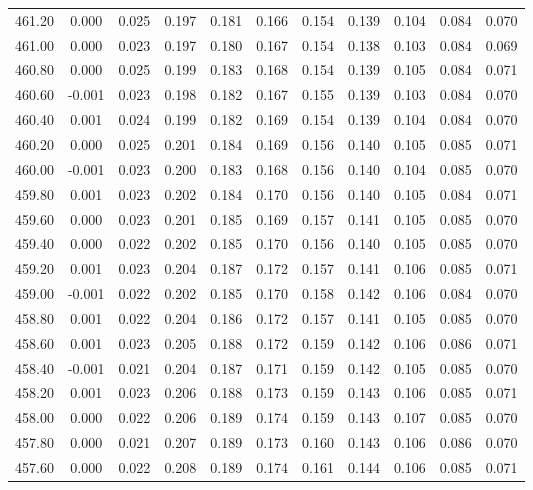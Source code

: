 \begin{longtable}{cccccccccc}
    461.20 &  0.000 &  0.025 &  0.197 &  0.181 &  0.166 &  0.154 &  0.139 &  0.104 &  0.084 &  0.070 \\
    461.00 &  0.000 &  0.023 &  0.197 &  0.180 &  0.167 &  0.154 &  0.138 &  0.103 &  0.084 &  0.069 \\
    460.80 &  0.000 &  0.025 &  0.199 &  0.183 &  0.168 &  0.154 &  0.139 &  0.105 &  0.084 &  0.071 \\
    460.60 & -0.001 &  0.023 &  0.198 &  0.182 &  0.167 &  0.155 &  0.139 &  0.103 &  0.084 &  0.070 \\
    460.40 &  0.001 &  0.024 &  0.199 &  0.182 &  0.169 &  0.154 &  0.139 &  0.104 &  0.084 &  0.070 \\
    460.20 &  0.000 &  0.025 &  0.201 &  0.184 &  0.169 &  0.156 &  0.140 &  0.105 &  0.085 &  0.071 \\
    460.00 & -0.001 &  0.023 &  0.200 &  0.183 &  0.168 &  0.156 &  0.140 &  0.104 &  0.085 &  0.070 \\
    459.80 &  0.001 &  0.023 &  0.202 &  0.184 &  0.170 &  0.156 &  0.140 &  0.105 &  0.084 &  0.071 \\
    459.60 &  0.000 &  0.023 &  0.201 &  0.185 &  0.169 &  0.157 &  0.141 &  0.105 &  0.085 &  0.070 \\
    459.40 &  0.000 &  0.022 &  0.202 &  0.185 &  0.170 &  0.156 &  0.140 &  0.105 &  0.085 &  0.070 \\
    459.20 &  0.001 &  0.023 &  0.204 &  0.187 &  0.172 &  0.157 &  0.141 &  0.106 &  0.085 &  0.071 \\
    459.00 & -0.001 &  0.022 &  0.202 &  0.185 &  0.170 &  0.158 &  0.142 &  0.106 &  0.084 &  0.070 \\
    458.80 &  0.001 &  0.022 &  0.204 &  0.186 &  0.172 &  0.157 &  0.141 &  0.105 &  0.085 &  0.070 \\
    458.60 &  0.001 &  0.023 &  0.205 &  0.188 &  0.172 &  0.159 &  0.142 &  0.106 &  0.086 &  0.071 \\
    458.40 & -0.001 &  0.021 &  0.204 &  0.187 &  0.171 &  0.159 &  0.142 &  0.105 &  0.085 &  0.070 \\
    458.20 &  0.001 &  0.023 &  0.206 &  0.188 &  0.173 &  0.159 &  0.143 &  0.106 &  0.085 &  0.071 \\
    458.00 &  0.000 &  0.022 &  0.206 &  0.189 &  0.174 &  0.159 &  0.143 &  0.107 &  0.085 &  0.070 \\
    457.80 &  0.000 &  0.021 &  0.207 &  0.189 &  0.173 &  0.160 &  0.143 &  0.106 &  0.086 &  0.070 \\
    457.60 &  0.000 &  0.022 &  0.208 &  0.189 &  0.174 &  0.161 &  0.144 &  0.106 &  0.085 &  0.071 \\

\end{longtable}
